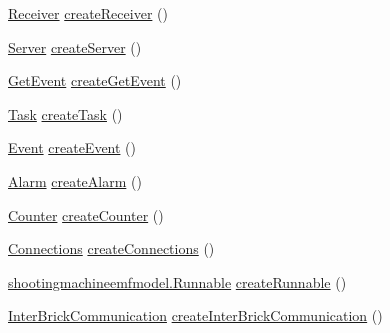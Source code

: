 \begin{DoxyCompactItemize}
\hyperlink{interfaceshootingmachineemfmodel_1_1_receiver}{Receiver} \hyperlink{classshootingmachineemfmodel_1_1impl_1_1_shootingmachineemfmodel_factory_impl_a88ffb32683a589fb33b84c95ae9fa84a}{create\-Receiver} ()
\item 
\hyperlink{interfaceshootingmachineemfmodel_1_1_server}{Server} \hyperlink{classshootingmachineemfmodel_1_1impl_1_1_shootingmachineemfmodel_factory_impl_a272bcf88b8f03121fa38e9af263dcc8e}{create\-Server} ()
\item 
\hyperlink{interfaceshootingmachineemfmodel_1_1_get_event}{Get\-Event} \hyperlink{classshootingmachineemfmodel_1_1impl_1_1_shootingmachineemfmodel_factory_impl_a57dc2cd6342e403d2e2006135195e555}{create\-Get\-Event} ()
\item 
\hyperlink{interfaceshootingmachineemfmodel_1_1_task}{Task} \hyperlink{classshootingmachineemfmodel_1_1impl_1_1_shootingmachineemfmodel_factory_impl_a505282673477ed4ab050493f63f94be2}{create\-Task} ()
\item 
\hyperlink{interfaceshootingmachineemfmodel_1_1_event}{Event} \hyperlink{classshootingmachineemfmodel_1_1impl_1_1_shootingmachineemfmodel_factory_impl_a03224a86ddf65e67d433f6150b866cf1}{create\-Event} ()
\item 
\hyperlink{interfaceshootingmachineemfmodel_1_1_alarm}{Alarm} \hyperlink{classshootingmachineemfmodel_1_1impl_1_1_shootingmachineemfmodel_factory_impl_aae0f73955d0959e0658cf7e18caddd8e}{create\-Alarm} ()
\item 
\hyperlink{interfaceshootingmachineemfmodel_1_1_counter}{Counter} \hyperlink{classshootingmachineemfmodel_1_1impl_1_1_shootingmachineemfmodel_factory_impl_a979d96fc7ef1a8d48e40e9a237567d6a}{create\-Counter} ()
\item 
\hyperlink{interfaceshootingmachineemfmodel_1_1_connections}{Connections} \hyperlink{classshootingmachineemfmodel_1_1impl_1_1_shootingmachineemfmodel_factory_impl_a5ea4b1154e547b0fbb302fce5a25664d}{create\-Connections} ()
\item 
\hyperlink{interfaceshootingmachineemfmodel_1_1_runnable}{shootingmachineemfmodel.\-Runnable} \hyperlink{classshootingmachineemfmodel_1_1impl_1_1_shootingmachineemfmodel_factory_impl_a18935f00ea670218532bb061181fa013}{create\-Runnable} ()
\item 
\hyperlink{interfaceshootingmachineemfmodel_1_1_inter_brick_communication}{Inter\-Brick\-Communication} \hyperlink{classshootingmachineemfmodel_1_1impl_1_1_shootingmachineemfmodel_factory_impl_adbf6bdebbb7b38e4753e383162b5be80}{create\-Inter\-Brick\-Communication} ()

\end{DoxyCompactItemize}
